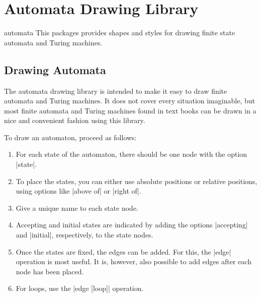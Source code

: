 %
%
%


\section{Automata Drawing Library}

\begin{tikzlibrary}{automata}
  This packages provides shapes and styles for drawing finite state
  automata and Turing machines. 
\end{tikzlibrary}


\subsection{Drawing Automata}

The automata drawing library is intended to make it easy to draw
finite automata and Turing machines. It does not cover every
situation imaginable, but most finite automata and Turing machines
found in text books can be drawn in a nice and convenient fashion
using this library. 

To draw an automaton, proceed as follows:
\begin{enumerate}
\item For each state of the automaton, there should be one node with
  the option |state|.
\item To place the states, you can either use absolute positions or
  relative positions, using options like |above of| or |right of|.
\item Give a unique name to each state node.
\item Accepting and initial states are indicated by adding the
  options |accepting| and |initial|, respectively, to the state
  nodes.
\item Once the states are fixed, the edges can be added. For this, the
  |edge| operation is most useful. It is, however, also possible to
  add edges after each node has been placed.
\item For loops, use the |edge [loop]| operation.
\end{enumerate}

